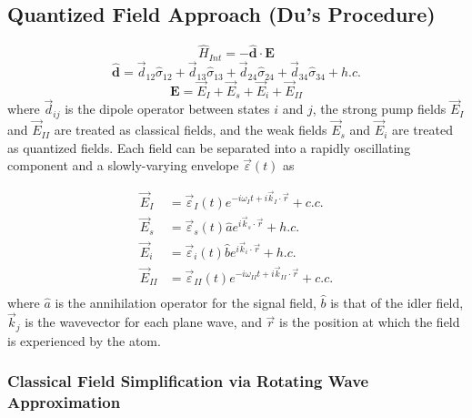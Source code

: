 \documentclass[aps,pra,showpacs,amsmath,amssymb,nofootinbib,longbibliography,superscriptaddress
]{revtex4-1}
\theoremstyle{definition}
\theoremstyle{remark}
\newcommand{\0}{\hat{0}}
\begin{document}
\subsection{Quantized Field Approach (Du's Procedure)}

\begin{equation}
    \hat{H}_{Int} = - \hat{\mathbf{d}} \cdot \mathbf{E}
\end{equation}
\begin{equation}
    \hat{\mathbf{d}} = \vec{d}_{12} \hat{\sigma}_{12} + \vec{d}_{13} \hat{\sigma}_{13} + \vec{d}_{24} \hat{\sigma}_{24} + \vec{d}_{34} \hat{\sigma}_{34} + h.c.
\end{equation}
\begin{equation}
    \mathbf{E} = \vec{E}_{I} + \vec{E}_{s} + \vec{E}_{i} + \vec{E}_{II}
\end{equation}
where $\vec{d}_{ij}$ is the dipole operator between states $i$ and $j$, the strong pump fields $\vec{E}_I$ and $\vec{E}_{II}$ are treated as classical fields, and the weak fields $\vec{E}_{s}$ and $\vec{E}_{i}$ are treated as quantized fields. Each field can be separated into a rapidly oscillating component and a slowly-varying envelope $\vec{\varepsilon}(t)$ as

\begin{align}
    \vec{E}_{I} &= \vec{\varepsilon}_I(t) e^{-i \omega_I t + i \vec{k}_I \cdot \vec{r}} + c.c.\\
    \vec{E}_{s} &= \vec{\varepsilon}_{s}(t) \hat{a} e^{i \vec{k}_{s} \cdot \vec{r}} + h.c.\\
    \vec{E}_{i} &= \vec{\varepsilon}_{i}(t) \hat{b} e^{i \vec{k}_{i} \cdot \vec{r}} + h.c.\\
    \vec{E}_{II} &= \vec{\varepsilon}_{II}(t) e^{-i \omega_{II} t + i \vec{k}_{II} \cdot \vec{r}} + c.c.\\
\end{align}
where $\hat{a}$ is the annihilation operator for the signal field, $\hat{b}$ is that of the idler field, $\vec{k}_j$ is the wavevector for each plane wave, and $\vec{r}$ is the position at which the field is experienced by the atom. 

\subsubsection{Classical Field Simplification via Rotating Wave Approximation}
\end{document}
